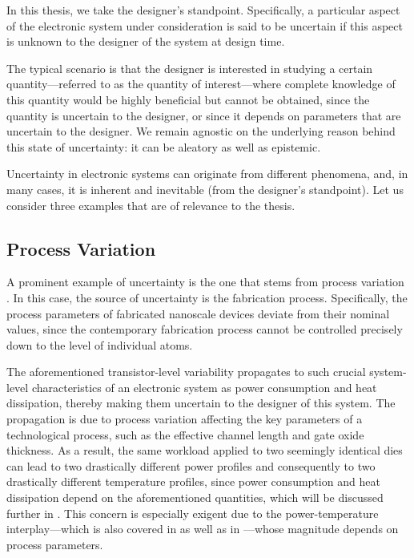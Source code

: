 In this thesis, we take the designer's standpoint. Specifically, a particular
aspect of the electronic system under consideration is said to be uncertain if
this aspect is unknown to the designer of the system at design time.

The typical scenario is that the designer is interested in studying a certain
quantity---referred to as the quantity of interest---where complete knowledge of
this quantity would be highly beneficial but cannot be obtained, since the
quantity \perse is uncertain to the designer, or since it depends on parameters
that are uncertain to the designer. We remain agnostic on the underlying reason
behind this state of uncertainty: it can be aleatory as well as epistemic.

Uncertainty in electronic systems can originate from different phenomena, and,
in many cases, it is inherent and inevitable (from the designer's standpoint).
Let us consider three examples that are of relevance to the thesis.

\subsection{Process Variation}

A prominent example of uncertainty is the one that stems from process variation
\cite{chandrakasan2000, srivastava2010}. In this case, the source of uncertainty
is the fabrication process. Specifically, the process parameters of fabricated
nanoscale devices deviate from their nominal values, since the contemporary
fabrication process cannot be controlled precisely down to the level of
individual atoms.

The aforementioned transistor-level variability propagates to such crucial
system-level characteristics of an electronic system as power consumption and
heat dissipation, thereby making them uncertain to the designer of this system.
The propagation is due to process variation affecting the key parameters of a
technological process, such as the effective channel length and gate oxide
thickness. As a result, the same workload applied to two seemingly identical
dies can lead to two drastically different power profiles and consequently to
two drastically different temperature profiles, since power consumption and heat
dissipation depend on the aforementioned quantities, which will be discussed
further in . This concern is especially exigent due to the
power-temperature interplay---which is also covered in  as
well as in ---whose magnitude depends on process
parameters.

